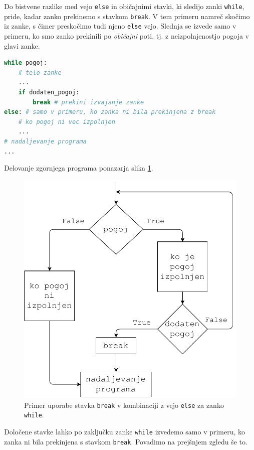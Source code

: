 Do bistvene razlike med vejo \texttt{else} in običajnimi stavki, ki sledijo zanki \texttt{while}, pride, kadar zanko prekinemo s stavkom \texttt{break}. V tem primeru namreč skočimo iz zanke, s čimer preskočimo tudi njeno \texttt{else} vejo. Slednja se izvede samo v primeru, ko smo zanko prekinili po \emph{običajni} poti, tj. z neizpolnjenostjo pogoja v glavi zanke.  
\begin{lstlisting}[language=Python]
while pogoj:
    # telo zanke
    ...
    if dodaten_pogoj:
        break # prekini izvajanje zanke
else: # samo v primeru, ko zanka ni bila prekinjena z break
    # ko pogoj ni vec izpolnjen
    ...
# nadaljevanje programa
...
\end{lstlisting}
Delovanje zgornjega programa ponazarja slika \ref{img:while3}.
\begin{figure}
    \centering
    \includegraphics[width=0.5\linewidth]{img/while3.pdf}
    \caption{Primer uporabe stavka \texttt{break} v kombinaciji z vejo \texttt{else} za zanko \texttt{while}.}
    \label{img:while3}
\end{figure}
Določene stavke lahko po zaključku zanke \texttt{while} izvedemo samo v primeru, ko zanka ni bila prekinjena s stavkom \texttt{break}. Povadimo na prejšnjem zgledu še to.

